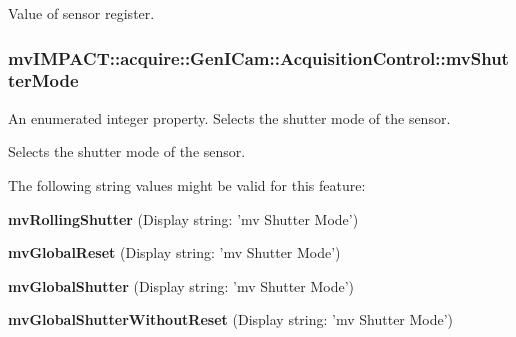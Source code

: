 Value of sensor register. \hypertarget{classmv_i_m_p_a_c_t_1_1acquire_1_1_gen_i_cam_1_1_acquisition_control_a1899fb978fe8419e74499c8cb58e1ca8}{
\subsubsection[{mv\+Shutter\+Mode}]{ mv\+I\+M\+P\+A\+C\+T\+::acquire\+::\+Gen\+I\+Cam\+::\+Acquisition\+Control\+::mv\+Shutter\+Mode}}\label{classmv_i_m_p_a_c_t_1_1acquire_1_1_gen_i_cam_1_1_acquisition_control_a1899fb978fe8419e74499c8cb58e1ca8}


An enumerated integer property. Selects the shutter mode of the sensor. 

Selects the shutter mode of the sensor.

The following string values might be valid for this feature\+:
\begin{DoxyItemize}
\item {\bfseries mv\+Rolling\+Shutter} (Display string\+: 'mv Shutter Mode')
\item {\bfseries mv\+Global\+Reset} (Display string\+: 'mv Shutter Mode')
\item {\bfseries mv\+Global\+Shutter} (Display string\+: 'mv Shutter Mode')
\item {\bfseries mv\+Global\+Shutter\+Without\+Reset} (Display string\+: 'mv Shutter Mode')
\end{DoxyItemize}

